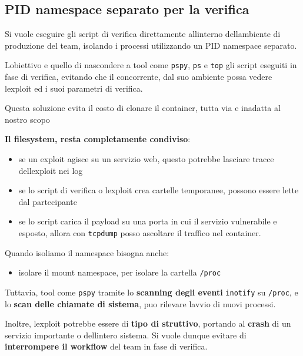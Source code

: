 \subsection{PID namespace separato per la
verifica}\label{pid-namespace-separato-per-la-verifica}

Si vuole eseguire gli script di verifica direttamente
all\textquotesingle interno dell\textquotesingle ambiente di produzione
del team, isolando i processi utilizzando un PID namespace separato.

L\textquotesingle obiettivo e\textquotesingle{} quello di nascondere a
tool come \passthrough{\lstinline!pspy!}, \passthrough{\lstinline!ps!} e
\passthrough{\lstinline!top!} gli script eseguiti in fase di verifica,
evitando che il concorrente, dal suo ambiente possa vedere
l\textquotesingle exploit ed i suoi parametri di verifica.

Questa soluzione evita il costo di clonare il container, tutta via
e\textquotesingle{} inadatta al nostro scopo

\textbf{Il filesystem, resta completamente condiviso}:

\begin{itemize}
\tightlist
\item
  se un exploit agisce su un servizio web, questo potrebbe lasciare
  tracce dell\textquotesingle exploit nei log
\item
  se lo script di verifica o l\textquotesingle exploit crea cartelle
  temporanee, possono essere lette dal partecipante
\item
  se lo script carica il payload su una porta in cui il servizio
  vulnerabile e\textquotesingle{} esposto, allora con
  \passthrough{\lstinline!tcpdump!} posso ascoltare il traffico nel
  container.
\end{itemize}

Quando isoliamo il namespace bisogna anche:

\begin{itemize}
\tightlist
\item
  isolare il mount namespace, per isolare la cartella
  \passthrough{\lstinline!/proc!}
\end{itemize}

Tuttavia, tool come \passthrough{\lstinline!pspy!} tramite lo
\textbf{scanning degli eventi} \passthrough{\lstinline!inotify!} su
\passthrough{\lstinline!/proc!}, e lo \textbf{scan delle chiamate di
sistema}, puo\textquotesingle{} rilevare l\textquotesingle avvio di
nuovi processi.

Inoltre, l\textquotesingle exploit potrebbe essere di \textbf{tipo di
struttivo}, portando al \textbf{crash} di un servizio importante o
dell\textquotesingle intero sistema. Si vuole dunque evitare di
\textbf{interrompere il workflow} del team in fase di verifica.

